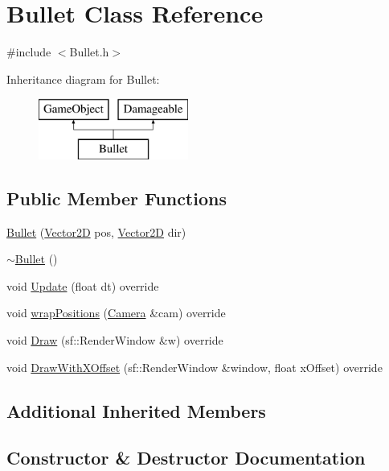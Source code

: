 \hypertarget{class_bullet}{}\section{Bullet Class Reference}
\label{class_bullet}


{\ttfamily \#include $<$Bullet.\+h$>$}

Inheritance diagram for Bullet\+:\begin{figure}[H]
\begin{center}
\leavevmode
\includegraphics[height=2.000000cm]{class_bullet}
\end{center}
\end{figure}
\subsection*{Public Member Functions}
\begin{DoxyCompactItemize}
\item 
\hyperlink{class_bullet_ab64df756dc1c7f021eba572f0f621b10}{Bullet} (\hyperlink{class_vector2_d}{Vector2D} pos, \hyperlink{class_vector2_d}{Vector2D} dir)
\item 
\hyperlink{class_bullet_aaeb5cb41d7db89f49007b08b41f1bfcf}{$\sim$\+Bullet} ()
\item 
void \hyperlink{class_bullet_a539b6ae5c3e6ae431f097296371e8d31}{Update} (float dt) override
\item 
void \hyperlink{class_bullet_ac33e38185d1800e4a532c71a620d1bf7}{wrap\+Positions} (\hyperlink{class_camera}{Camera} \&cam) override
\item 
void \hyperlink{class_bullet_a44b861616d73fd5cd0fe78af2acda9c1}{Draw} (sf\+::\+Render\+Window \&w) override
\item 
void \hyperlink{class_bullet_ae3696edcf0c726c8c1b18a62faef8c03}{Draw\+With\+X\+Offset} (sf\+::\+Render\+Window \&window, float x\+Offset) override
\end{DoxyCompactItemize}
\subsection*{Additional Inherited Members}


\subsection{Constructor \& Destructor Documentation}
\hypertarget{class_bullet_ab64df756dc1c7f021eba572f0f621b10}{}\label{class_bullet_ab64df756dc1c7f021eba572f0f621b10} 
